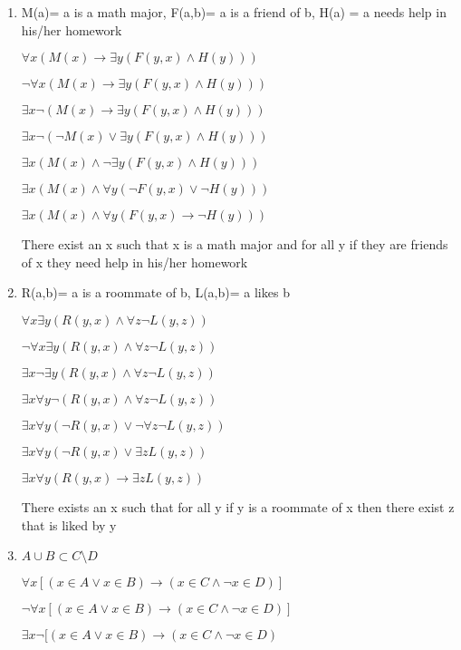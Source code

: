 \documentclass{article}
\begin{document}
\begin{enumerate}[label=(\alph*)]
    \item 
    M(a)= a is a math major, F(a,b)= a is a friend of b, H(a) = a needs help in his/her homework
    
    $\forall x (M(x)\rightarrow \exists y(F(y,x) \land H(y)))$
    
    $\neg \forall x (M(x)\rightarrow \exists y(F(y,x) \land H(y)))$
    
    $\exists x \neg (M(x)\rightarrow \exists y(F(y,x) \land H(y)))$
    
    $\exists x \neg (\neg M(x)\lor \exists y(F(y,x) \land H(y)))$
    
    $\exists x ( M(x)\land \neg \exists y(F(y,x) \land H(y)))$
    
    $\exists x ( M(x)\land  \forall y(\neg F(y,x) \lor \neg H(y)))$
    
    $\exists x ( M(x)\land  \forall y(F(y,x) \rightarrow \neg H(y)))$
    
    There exist an x such that x is a math major and for all y if they are friends of x they need help in his/her homework
    \item
    R(a,b)= a is a roommate of b, L(a,b)= a likes b
    
    $\forall x \exists y(R(y,x) \land \forall z \neg L(y,z))$
    
    $\neg \forall x \exists y(R(y,x) \land \forall z \neg L(y,z))$
    
    $\exists x \neg \exists y(R(y,x) \land \forall z \neg L(y,z))$
    
    $\exists x \forall y \neg (R(y,x) \land \forall z \neg L(y,z))$
    
    $\exists x \forall y (\neg R(y,x) \lor \neg \forall z \neg L(y,z))$
    
    $\exists x \forall y (\neg R(y,x) \lor \exists z L(y,z))$
    
    $\exists x \forall y (R(y,x) \rightarrow \exists z L(y,z))$
    
    There exists an x such that for all y  if y is a roommate of x then there exist z that is liked by y
    \item
    $A \cup B \subset C \setminus D$
    
    $\forall x[( x \in A \lor x \in B) \rightarrow (x \in C \land \neg x \in D)]$
    
    $\neg \forall x[( x \in A \lor x \in B) \rightarrow (x \in C \land \neg x \in D)]$
    
    $\exists x  \neg [( x \in A \lor x \in B) \rightarrow (x \in C \land \neg x \in D)$
    

\end{enumerate}
\end{document}
